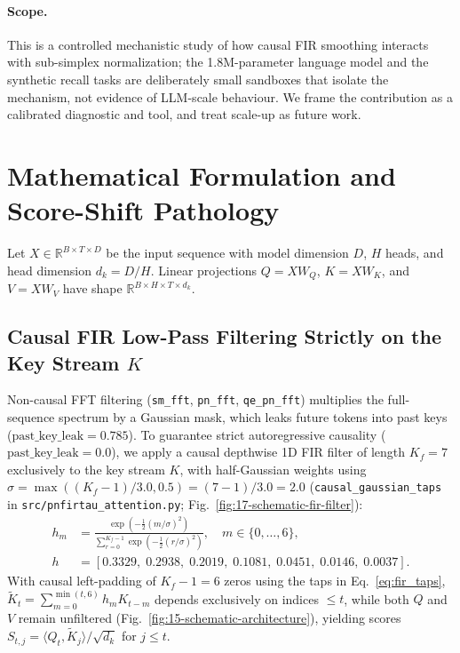 \documentclass[11pt,a4paper]{article}
\begin{document}
\paragraph{Scope.} This is a controlled mechanistic study of how causal FIR smoothing interacts with sub-simplex normalization; the 1.8M-parameter language model and the synthetic recall tasks are deliberately small sandboxes that isolate the mechanism, not evidence of LLM-scale behaviour. We frame the contribution as a calibrated diagnostic and tool, and treat scale-up as future work.

\section{Mathematical Formulation and Score-Shift Pathology}

Let $X \in \mathbb{R}^{B \times T \times D}$ be the input sequence with model dimension $D$, $H$ heads, and head dimension $d_k = D/H$. Linear projections $Q = X W_Q$, $K = X W_K$, and $V = X W_V$ have shape $\mathbb{R}^{B \times H \times T \times d_k}$.

\subsection{Causal FIR Low-Pass Filtering Strictly on the Key Stream $K$}

Non-causal FFT filtering (\texttt{sm\_fft}, \texttt{pn\_fft}, \texttt{qe\_pn\_fft}) multiplies the full-sequence spectrum by a Gaussian mask, which leaks future tokens into past keys ($\text{past\_key\_leak} = 0.785$). To guarantee strict autoregressive causality ($\text{past\_key\_leak} = 0.0$), we apply a causal depthwise 1D FIR filter of length $K_f = 7$ exclusively to the key stream $K$, with half-Gaussian weights using $\sigma = \max((K_f - 1)/3.0, 0.5) = (7 - 1)/3.0 = 2.0$ (\texttt{causal\_gaussian\_taps} in \texttt{src/pnfirtau\_attention.py}; Fig.~\ref{fig:17-schematic-fir-filter}):
\begin{equation}
\label{eq:fir_taps}
\begin{aligned}
h_m &= \frac{\exp\!\left(-\frac{1}{2}(m / \sigma)^2\right)}{\sum_{r=0}^{K_f-1} \exp\!\left(-\frac{1}{2}(r / \sigma)^2\right)}, \quad m \in \{0, \dots, 6\}, \\
h &= [0.3329,\; 0.2938,\; 0.2019,\; 0.1081,\; 0.0451,\; 0.0146,\; 0.0037].
\end{aligned}
\end{equation}
With causal left-padding of $K_f - 1 = 6$ zeros using the taps in Eq.~\eqref{eq:fir_taps}, $\tilde{K}_t = \sum_{m=0}^{\min(t, 6)} h_m K_{t-m}$ depends exclusively on indices $\le t$, while both $Q$ and $V$ remain unfiltered (Fig.~\ref{fig:15-schematic-architecture}), yielding scores $S_{t,j} = \langle Q_t, \tilde{K}_j \rangle / \sqrt{d_k}$ for $j \le t$.
\end{document}
